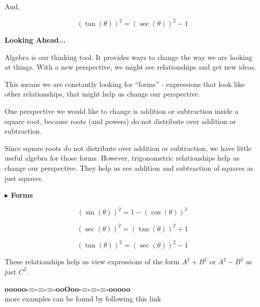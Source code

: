 \documentclass{ximera}
\begin{document}
And, 


\[
(\tan(\theta))^2 = (\sec(\theta))^2 - 1
\]




\textbf{\textcolor{red!70!black}{Looking Ahead...}}



Algebra is our thinking tool.  It provides ways to change the way we are looking at things. With a new perspective, we might see relationships and get new ideas.



This means we are constantly looking for ``forms'' - expressions that look like other relationships, that might help us change our perspective.


One perspective we would like to change is addition or subtraction inside a square root, because roots (and powers) do not distribute over addition or subtraction.

Since square roots do not distribute over addition or subtraction, we have little useful algebra for those forms.  However, trigonometric relationships help us change our perspective.  They help us see addition and subtraction of squares as just squares.




\textbf{\textcolor{blue!55!black}{$\blacktriangleright$ Forms}}


\[
(\sin(\theta))^2 = 1 - (\cos(\theta))^2
\]




\[
(\sec(\theta))^2 = (\tan(\theta))^2 + 1 
\]




\[
(\tan(\theta))^2 = (\sec(\theta))^2 - 1
\]





These relationships help us view expressions of the form $A^2 + B^2$ or $A^2 - B^2$ as just $C^2$.






















\begin{onlineOnly}
\begin{center}
\textbf{\textcolor{green!50!black}{ooooo-=-=-=-ooOoo-=-=-=-ooooo}} \\

more examples can be found by following this link\\ 

\end{center}
\end{onlineOnly}
\end{document}
